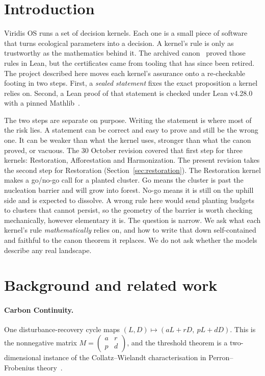 \documentclass[11pt]{article}
\theoremstyle{definition}
\theoremstyle{remark}
\begin{document}
\section{Introduction}
Viridis OS runs a set of decision kernels. Each one is a small piece of software that turns ecological
parameters into a decision. A kernel's rule is only as trustworthy as the mathematics behind it.
The archived canon~\cite{HartCanon2026} proved those rules in Lean, but the certificates came from tooling that has
since been retired. The project described here moves each kernel's assurance onto a re-checkable footing in two steps.
First, a \emph{sealed statement} fixes the exact proposition a kernel relies on.
Second, a Lean proof of that statement is checked under Lean v4.28.0 with a pinned Mathlib~\cite{Mathlib2020}.

The two steps are separate on purpose. Writing the statement is where most of the risk lies.
A statement can be correct and easy to prove and still be the wrong one. It can be weaker than what the kernel uses,
stronger than what the canon proved, or vacuous. The 30 October revision covered that first step for three kernels:
Restoration, Afforestation and Harmonization.
The present revision takes the second step for Restoration (Section~\ref{sec:restoration}).
The Restoration kernel makes a go/no-go call for a planted cluster. Go means the cluster is past the nucleation barrier
and will grow into forest. No-go means it is still on the uphill side and is expected to dissolve.
A wrong rule here would send planting budgets to clusters that cannot persist, so the geometry of the barrier is worth
checking mechanically, however elementary it is.
The question is narrow. We ask what each kernel's rule \emph{mathematically} relies on, and how to write that down
self-contained and faithful to the canon theorem it replaces. We do not ask whether the models describe any real landscape.

\section{Background and related work}
\paragraph{Carbon Continuity.} One disturbance-recovery cycle maps $(L,D)\mapsto(aL+rD,\ pL+dD)$.
This is the nonnegative matrix $M=\begin{pmatrix}a&r\\p&d\end{pmatrix}$, and the threshold theorem is a
two-dimensional instance of the Collatz--Wielandt characterisation in Perron--Frobenius theory~\cite{BermanPlemmons1994}.
\end{document}
